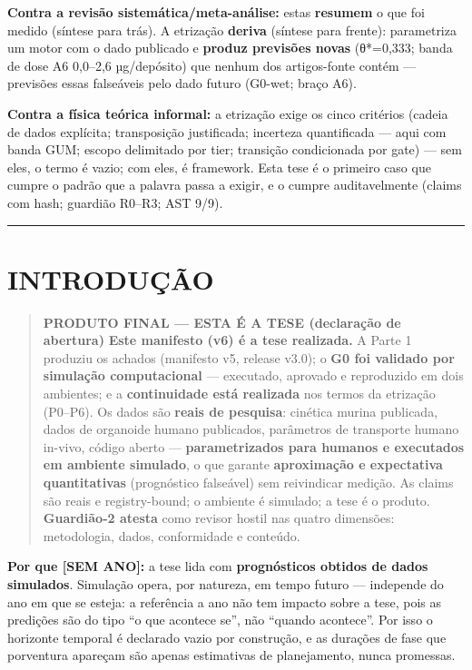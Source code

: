 \documentclass[12pt,a4paper,oneside]{report}
\begin{document}
\textbf{Contra a revisão sistemática/meta-análise:} estas
\textbf{resumem} o que foi medido (síntese para trás). A etrização
\textbf{deriva} (síntese para frente): parametriza um motor com o dado
publicado e \textbf{produz previsões novas} (θ*=0,333; banda de dose A6
0,0--2,6 µg/depósito) que nenhum dos artigos-fonte contém --- previsões
essas falseáveis pelo dado futuro (G0-wet; braço A6).

\textbf{Contra a física teórica informal:} a etrização exige os cinco
critérios (cadeia de dados explícita; transposição justificada;
incerteza quantificada --- aqui com banda GUM; escopo delimitado por
tier; transição condicionada por gate) --- sem eles, o termo é vazio;
com eles, é framework. Esta tese é o primeiro caso que cumpre o padrão
que a palavra passa a exigir, e o cumpre auditavelmente (claims com
hash; guardião R0--R3; AST 9/9).

\begin{center}\rule{0.5\linewidth}{0.5pt}\end{center}

\hypertarget{introduuxe7uxe3o}{%
\chapter{INTRODUÇÃO}\label{introduuxe7uxe3o}}

\begin{quote}
\textbf{PRODUTO FINAL --- ESTA É A TESE (declaração de abertura)}
\textbf{Este manifesto (v6) é a tese realizada.} A Parte 1 produziu os
achados (manifesto v5, release v3.0); o \textbf{G0 foi validado por
simulação computacional} --- executado, aprovado e reproduzido em dois
ambientes; e a \textbf{continuidade está realizada} nos termos da
etrização (P0--P6). Os dados são \textbf{reais de pesquisa}: cinética
murina publicada, dados de organoide humano publicados, parâmetros de
transporte humano in-vivo, código aberto --- \textbf{parametrizados para
humanos e executados em ambiente simulado}, o que garante
\textbf{aproximação e expectativa quantitativas} (prognóstico falseável)
sem reivindicar medição. As claims são reais e registry-bound; o
ambiente é simulado; a tese é o produto. \textbf{Guardião-2 atesta} como
revisor hostil nas quatro dimensões: metodologia, dados, conformidade e
conteúdo.
\end{quote}

\textbf{Por que {[}SEM ANO{]}:} a tese lida com \textbf{prognósticos
obtidos de dados simulados}. Simulação opera, por natureza, em tempo
futuro --- independe do ano em que se esteja: a referência a ano não tem
impacto sobre a tese, pois as predições são do tipo ``o que acontece
se'', não ``quando acontece''. Por isso o horizonte temporal é declarado
vazio por construção, e as durações de fase que porventura apareçam são
apenas estimativas de planejamento, nunca promessas.
\end{document}
